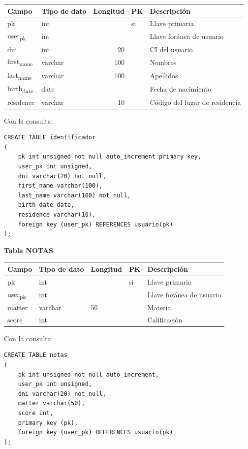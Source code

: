 \documentclass[letter]{article}
\begin{document}
\begin{center}
\begin{tabular}{llrll}
Campo & Tipo de dato & Longitud & PK & Descripción\\
\hline
pk & int &  & si & Llave primaria\\
user\textsubscript{pk} & int &  &  & Llave foránea de usuario\\
dni & int & 20 &  & CI del usuario\\
first\textsubscript{name} & varchar & 100 &  & Nombres\\
last\textsubscript{name} & varchar & 100 &  & Apellidos\\
birth\textsubscript{date} & date &  &  & Fecha de nacimiento\\
residence & varchar & 10 &  & Código del lugar de residencia\\
\end{tabular}
\end{center}

Con la consulta:

\begin{verbatim}
CREATE TABLE identificador
(
    pk int unsigned not null auto_increment primary key,
    user_pk int unsigned,
    dni varchar(20) not null,
    first_name varchar(100),
    last_name varchar(100) not null,
    birth_date date,
    residence varchar(10),
    foreign key (user_pk) REFERENCES usuario(pk)
);
\end{verbatim}

\textbf{Tabla NOTAS}

\begin{center}
\begin{tabular}{lllll}
Campo & Tipo de dato & Longitud & PK & Descripción\\
\hline
pk & int &  & si & Llave primaria\\
user\textsubscript{pk} & int &  &  & Llave foránea de usuario\\
matter & varchar & 50 &  & Materia\\
score & int &  &  & Calificación\\
\end{tabular}
\end{center}

Con la consulta:

\begin{verbatim}
CREATE TABLE notas
(
    pk int unsigned not null auto_increment,
    user_pk int unsigned,
    dni varchar(20) not null,
    matter varchar(50),
    score int,
    primary key (pk),
    foreign key (user_pk) REFERENCES usuario(pk)
);
\end{verbatim}
\end{document}
